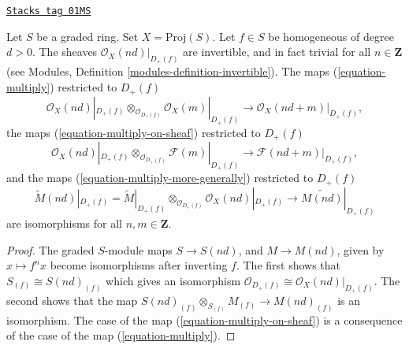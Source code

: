 \begin{lemma}
\label{constructions-lemma-when-invertible}
\href{https://stacks.math.columbia.edu/tag/01MS}{\texttt{Stacks tag 01MS}}

Let $S$ be a graded ring. Set $X = \text{Proj}(S)$.
Let $f \in S$ be homogeneous of degree $d > 0$.
The sheaves $\mathcal{O}_X(nd)|_{D_{+}(f)}$ are invertible,
and in fact trivial for all $n \in \mathbf{Z}$
(see Modules, Definition \ref{modules-definition-invertible}).
The maps (\ref{equation-multiply}) restricted to $D_{+}(f)$
$$
\mathcal{O}_X(nd)|_{D_{+}(f)} \otimes_{\mathcal{O}_{D_{+}(f)}}
\mathcal{O}_X(m)|_{D_{+}(f)}
\longrightarrow
\mathcal{O}_X(nd + m)|_{D_{+}(f)},
$$
the maps (\ref{equation-multiply-on-sheaf}) restricted to $D_+(f)$
$$
\mathcal{O}_X(nd)|_{D_{+}(f)} \otimes_{\mathcal{O}_{D_{+}(f)}}
\mathcal{F}(m)|_{D_{+}(f)}
\longrightarrow
\mathcal{F}(nd + m)|_{D_{+}(f)},
$$
and the maps (\ref{equation-multiply-more-generally})
restricted to $D_{+}(f)$
$$
\widetilde M(nd)|_{D_{+}(f)}
=
\widetilde M|_{D_{+}(f)}
\otimes_{\mathcal{O}_{D_{+}(f)}}
\mathcal{O}_X(nd)|_{D_{+}(f)}
\longrightarrow
\widetilde{M(nd)}|_{D_{+}(f)}
$$
are isomorphisms for all $n, m \in \mathbf{Z}$.
\end{lemma}

\begin{proof}
The graded $S$-module maps $S \to S(nd)$, and $M \to M(nd)$, given by
$x \mapsto f^n x$ become isomorphisms after inverting $f$. The first shows that
$S_{(f)} \cong S(nd)_{(f)}$ which gives an isomorphism
$\mathcal{O}_{D_{+}(f)} \cong \mathcal{O}_X(nd)|_{D_{+}(f)}$.
The second shows that the map
$S(nd)_{(f)} \otimes_{S_{(f)}} M_{(f)} \to M(nd)_{(f)}$
is an isomorphism. The case of the map (\ref{equation-multiply-on-sheaf})
is a consequence of the case of the map (\ref{equation-multiply}).
\end{proof}

